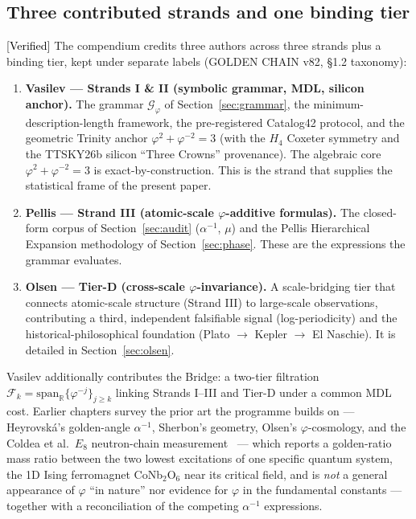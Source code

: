 \documentclass[11pt]{article}
\newcommand{\Verified}{\textcolor{black}{[Verified]}}
\newcommand{\phigr}{\varphi}
\begin{document}
\subsection{Three contributed strands and one binding tier}\label{sec:strands}
\Verified{} The compendium credits three authors across three strands plus a binding tier, kept under separate labels (GOLDEN CHAIN v82, \S1.2 taxonomy):
\begin{enumerate}[leftmargin=*]
\item \textbf{Vasilev --- Strands I \& II (symbolic grammar, MDL, silicon anchor).} The grammar $\mathcal{G}_{\phigr}$ of Section~\ref{sec:grammar}, the minimum-description-length framework, the pre-registered Catalog42 protocol, and the geometric Trinity anchor $\phigr^2 + \phigr^{-2} = 3$ (with the $H_4$ Coxeter symmetry and the TTSKY26b silicon ``Three Crowns'' provenance). The algebraic core $\phigr^2 + \phigr^{-2} = 3$ is exact-by-construction. This is the strand that supplies the statistical frame of the present paper.
\item \textbf{Pellis --- Strand III (atomic-scale $\phigr$-additive formulas).} The closed-form corpus of Section~\ref{sec:audit} ($\alpha^{-1}$, $\mu$) and the Pellis Hierarchical Expansion methodology of Section~\ref{sec:phase}. These are the expressions the grammar evaluates.
\item \textbf{Olsen --- Tier-D (cross-scale $\phigr$-invariance).} A scale-bridging tier that connects atomic-scale structure (Strand III) to large-scale observations, contributing a third, independent falsifiable signal (log-periodicity) and the historical-philosophical foundation (Plato $\to$ Kepler $\to$ El Naschie). It is detailed in Section~\ref{sec:olsen}.
\end{enumerate}
Vasilev additionally contributes the Bridge: a two-tier filtration $\mathcal{F}_k = \mathrm{span}_{\mathbb{R}}\{\phigr^{-j}\}_{j \ge k}$ linking Strands I--III and Tier-D under a common MDL cost. Earlier chapters survey the prior art the programme builds on --- Heyrovsk\'a's golden-angle $\alpha^{-1}$, Sherbon's geometry, Olsen's $\phigr$-cosmology, and the Coldea et al.\ $E_8$ neutron-chain measurement~\cite{coldea} --- which reports a golden-ratio mass ratio between the two lowest excitations of one specific quantum system, the 1D Ising ferromagnet \mbox{CoNb$_2$O$_6$} near its critical field, and is \emph{not} a general appearance of $\phigr$ ``in nature'' nor evidence for $\phigr$ in the fundamental constants --- together with a reconciliation of the competing $\alpha^{-1}$ expressions.
\end{document}
